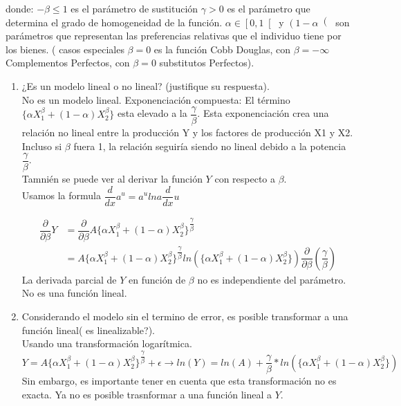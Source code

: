 \documentclass[12pt,a4paper]{report}
\begin{document}
\begin{enumerate}
donde: $-\beta \leq 1$ es el parámetro de sustitución $\gamma > 0$ es el parámetro que determina el grado de homogeneidad de la función. $\alpha \in \left[ 0, 1\right[$ y $\left( 1 - \alpha\right( $ son parámetros que representan las preferencias relativas que el individuo tiene por los bienes. ( casos especiales $\beta = 0$ es la función Cobb Douglas, con $\beta=-\infty$ Complementos Perfectos, con $\beta = 0$ substitutos Perfectos).

\begin{enumerate}
\item ¿Es un modelo lineal o no lineal? (justifique su respuesta).\\

No es un modelo lineal. Exponenciación compuesta: El término $\lbrace \alpha X^{\beta}_{1}+(1-\alpha)X^{\beta}_{2}\rbrace$ esta elevado a la ${\dfrac{\gamma}{\beta}}$. Esta exponenciación crea una relación no lineal entre la producción Y y los factores de producción X1 y X2. Incluso si $\beta$ fuera 1, la relación seguiría siendo no lineal debido a la potencia ${\dfrac{\gamma}{\beta}}$.\\

Tamnién se puede ver al derivar la función $Y$ con respecto a $\beta$.\\
Usamos la formula $\dfrac{d}{dx}a^{u}=a^{u}ln a\dfrac{d}{dx}u$

\begin{align*}
\dfrac{\partial}{\partial\beta}Y&=\dfrac{\partial}{\partial\beta}A\lbrace \alpha X^{\beta}_{1}+(1-\alpha)X^{\beta}_{2}\rbrace^{\dfrac{\gamma}{\beta}}\\
&=A\lbrace \alpha X^{\beta}_{1}+(1-\alpha)X^{\beta}_{2}\rbrace^{\dfrac{\gamma}{\beta}}ln\left(\lbrace \alpha X^{\beta}_{1}+(1-\alpha)X^{\beta}_{2}\rbrace \right)\dfrac{\partial}{\partial\beta}\left(\dfrac{\gamma}{\beta}\right)
\end{align*}
La derivada parcial de $Y$ en función de $\beta$ no es independiente del parámetro. No es una función lineal.

\item Considerando el modelo sin el termino de error, es posible transformar a una función lineal( es
linealizable?).\\
Usando una transformación logarítmica.\\

$$ Y=A\lbrace \alpha X^{\beta}_{1}+(1-\alpha)X^{\beta}_{2}\rbrace^{\dfrac{\gamma}{\beta}} + \epsilon\rightarrow ln(Y)=ln(A)+{\dfrac{\gamma}{\beta}}*ln(\lbrace \alpha X^{\beta}_{1}+(1-\alpha)X^{\beta}_{2}\rbrace)$$
Sin embargo, es importante tener en cuenta que esta transformación no es exacta. Ya no es posible trasnformar a una función lineal a $Y$.\\


\end{enumerate}
\end{enumerate}
\end{document}
